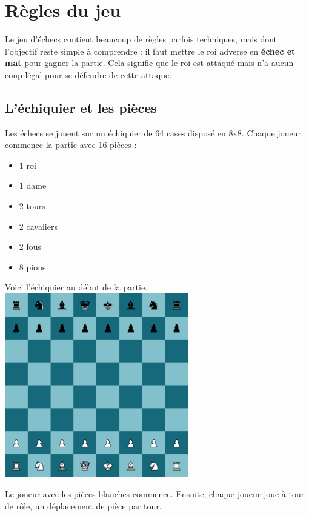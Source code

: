 \documentclass{article}
\begin{document}
\section{Règles du jeu}
Le jeu d'échecs contient beaucoup de règles parfois techniques, mais dont l'objectif reste simple à comprendre :
il faut mettre le roi adverse en \textbf{échec et mat} pour gagner la partie. Cela signifie que le roi est attaqué 
mais n'a aucun coup légal pour se défendre de cette attaque.

\subsection{L'échiquier et les pièces}
Les échecs se jouent sur un échiquier de 64 cases disposé en 8x8. Chaque joueur commence la partie avec 16 pièces :
\begin{itemize}
    \item 1 roi
    \item 1 dame
    \item 2 tours
    \item 2 cavaliers
    \item 2 fous
    \item 8 pions
\end{itemize}

\begin{minipage}{\textwidth}
    \centering
    Voici l'échiquier au début de la partie. \\
    \includegraphics[width=0.6\textwidth]{jeuDepart.png}
    \vspace{0.5cm}
\end{minipage}

Le joueur avec les pièces blanches commence. Ensuite, chaque joueur joue à tour de rôle, un déplacement de pièce par tour.
\end{document}
